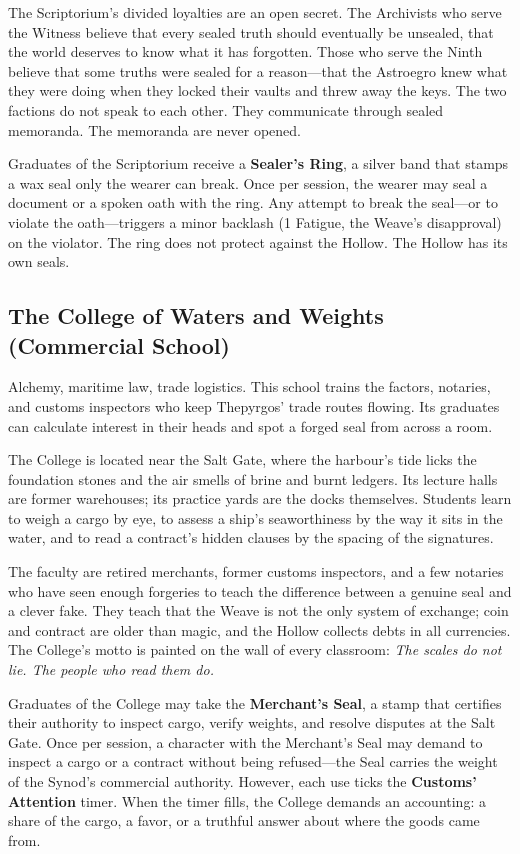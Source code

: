 \documentclass[10pt,twocolumn]{book}
\begin{document}
The Scriptorium's divided loyalties are an open secret. The Archivists who serve the Witness believe that every sealed truth should eventually be unsealed, that the world deserves to know what it has forgotten. Those who serve the Ninth believe that some truths were sealed for a reason---that the Astroegro knew what they were doing when they locked their vaults and threw away the keys. The two factions do not speak to each other. They communicate through sealed memoranda. The memoranda are never opened.

Graduates of the Scriptorium receive a \textbf{Sealer's Ring}, a silver band that stamps a wax seal only the wearer can break. Once per session, the wearer may seal a document or a spoken oath with the ring. Any attempt to break the seal---or to violate the oath---triggers a minor backlash (1 Fatigue, the Weave's disapproval) on the violator. The ring does not protect against the Hollow. The Hollow has its own seals.

\subsection{The College of Waters and Weights (Commercial School)}

Alchemy, maritime law, trade logistics. This school trains the factors, notaries, and customs inspectors who keep Thepyrgos' trade routes flowing. Its graduates can calculate interest in their heads and spot a forged seal from across a room.

The College is located near the Salt Gate, where the harbour's tide licks the foundation stones and the air smells of brine and burnt ledgers. Its lecture halls are former warehouses; its practice yards are the docks themselves. Students learn to weigh a cargo by eye, to assess a ship's seaworthiness by the way it sits in the water, and to read a contract's hidden clauses by the spacing of the signatures.

The faculty are retired merchants, former customs inspectors, and a few notaries who have seen enough forgeries to teach the difference between a genuine seal and a clever fake. They teach that the Weave is not the only system of exchange; coin and contract are older than magic, and the Hollow collects debts in all currencies. The College's motto is painted on the wall of every classroom: \textit{The scales do not lie. The people who read them do.}

Graduates of the College may take the \textbf{Merchant's Seal}, a stamp that certifies their authority to inspect cargo, verify weights, and resolve disputes at the Salt Gate. Once per session, a character with the Merchant's Seal may demand to inspect a cargo or a contract without being refused---the Seal carries the weight of the Synod's commercial authority. However, each use ticks the \textbf{Customs' Attention} timer. When the timer fills, the College demands an accounting: a share of the cargo, a favor, or a truthful answer about where the goods came from.
\end{document}
